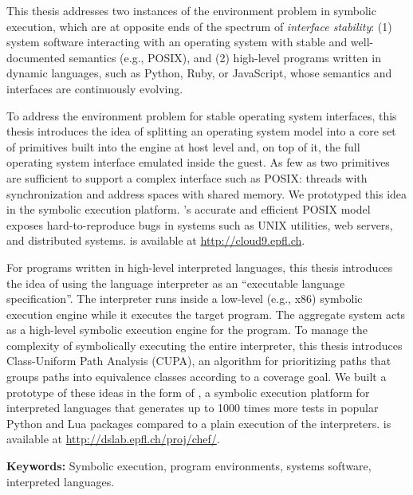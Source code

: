 This thesis addresses two instances of the environment problem in symbolic execution, which are at opposite ends of the spectrum of \emph{interface stability}: (1) system software interacting with an operating system with stable and well-documented semantics (e.g., POSIX), and (2) high-level programs written in dynamic languages, such as Python, Ruby, or JavaScript, whose semantics and interfaces are continuously evolving.

To address the environment problem for stable operating system interfaces, this thesis introduces the idea of splitting an operating system model into a core set of primitives built into the engine at host level and, on top of it, the full operating system interface emulated inside the guest.
%
As few as two primitives are sufficient to support a complex interface such as POSIX: threads with synchronization and address spaces with shared memory.
%
We prototyped this idea in the \emph{\cnine} symbolic execution platform. \cnine's accurate and efficient POSIX model exposes hard-to-reproduce bugs in systems such as UNIX utilities, web servers, and distributed systems.
%
\cnine is available at {\url{http://cloud9.epfl.ch}}.

For programs written in high-level interpreted languages, this thesis introduces the idea of using the language interpreter as an ``executable language specification''.  The interpreter runs inside a low-level (e.g., x86) symbolic execution engine while it executes the target program.  The aggregate system acts as a high-level symbolic execution engine for the program.
%
To manage the complexity of symbolically executing the entire interpreter, this thesis introduces Class-Uniform Path Analysis (CUPA), an algorithm for prioritizing paths that groups paths into equivalence classes according to a coverage goal.
%
We built a prototype of these ideas in the form of \emph{\chef}, a symbolic execution platform for interpreted languages that generates up to 1000 times more tests in popular Python and Lua packages compared to a plain execution of the interpreters.
%
\chef is available at {\url{http://dslab.epfl.ch/proj/chef/}}.

\noindent \textbf{Keywords:} Symbolic execution, program environments, systems software, interpreted languages.


